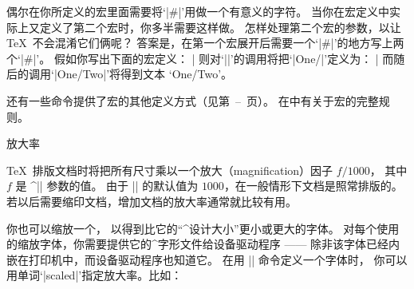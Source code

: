 {{{{{{{{{{{%
偶尔在你所定义的宏里面需要将`|#|'用做一个有意义的字符。
当你在宏定义中实际上又定义了第二个宏时，你多半需要这样做。
怎样处理第二个宏的参数，以让 \TeX\ 不会混淆它们俩呢？
答案是，在第一个宏展开后需要一个‘|#|’的地方写上两个‘|#|’。
假如你写出下面的宏定义：
\def\first#1{\def\second##1{#1/##1}}
\csdisplay
\def\first#1{\def\second##1{#1/##1}}
|
则对‘|\first{One}|’的调用将把‘|\second|’定义为：
\csdisplay
\def\second#1{One/#1}
|
而随后的调用‘|\second{Two}|’将得到文本
\def\second#1{One/#1}%
`\second {Two}'。

还有一些命令提供了宏的其他定义方式（见第~--~页）。
在中有关于宏的完整规则。
}%
\endconcept


\concept 放大率

\TeX\ 排版文档时将把所有尺寸乘以一个放大（magnification）因子 $f/1000$，
其中 $f$ 是 ^|\mag| 参数\ctsref\mag 的值。
由于 |\mag| 的默认值为 $1000$，在一般情形下文档是照常排版的。
若以后需要缩印文档，增加文档的放大率通常就比较有用。

你也可以缩放一个，
以得到比它的“^{设计大小}”更小或更大的字体。
对每个使用的缩放字体，你需要提供它的^{字形文件}给设备驱动程序%
——
除非该字体已经内嵌在打印机中，而设备驱动程序也知道它。
在用 |\font| 命令\ctsref{\font}定义一个字体时，
你可以用单词‘|scaled|’指定放大率。比如：

}}}}}}}}}}
